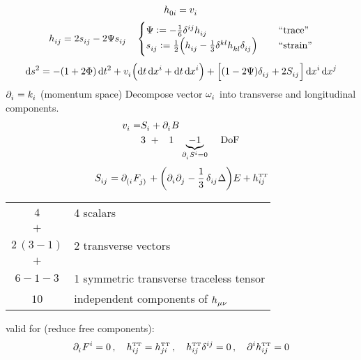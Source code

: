 \begin{equation}
    \tensor{h}{_{0i}} = \tensor{v}{_i}
\end{equation}
\begin{equation}
    \tensor{h}{_{ij}} = 2\tensor{s}{_{ij}} - 2\Psi\tensor{s}{_{ij}}\,\quad
    \begin{cases}
\Psi := -\frac{1}{6}\tensor{\delta}{^{ij}}\tensor{h}{_{ij}}\,\quad
&\text{``trace''} \\
\tensor{s}{_{ij}} := \frac{1}{2} \left(\tensor{h}{_{ij}} - \frac{1}{3}\tensor{\delta}{^{kl}}\tensor{h}{_{kl}}\tensor{\delta}{_{ij}}\right)\,\quad &\text{``strain''}
\end{cases}
\end{equation}
\begin{equation}
    \dif s^2 = -\left(1+2\Phi\right)\dif t^2 + \tensor{v}{_i} \left(\dif t \dif \tensor{x}{^i} + \dif t \dif \tensor{x}{^i}\right) + \left[\left(1-2\Psi\right)\tensor{\delta}{_{ij}} + 2 \tensor{S}{_{ij}} \right]\dif \tensor{x}{^i}\dif \tensor{x}{^j}
\end{equation}
$\tensor{\partial}{_i} = \tensor{k}{_i}$ (momentum space)
Decompose vector $\tensor{\omega}{_i}$ into transverse and longitudinal components.
\begin{align}
    \tensor{v}{_i} = &\tensor{S}{_i} + \tensor{\partial}{_i}B\\
    &3\,\,+\,\,\,\,\,1\,\,\,\,\underbrace{-1}_{\tensor{\partial}{_i}\tensor{S}{^i}=0}\,\quad \text{DoF}
\end{align}
\begin{equation}
    \tensor{S}{_{ij}} = \tensor{\partial}{_{(i}}\tensor{F}{_{j)}} + \left( \tensor{\partial}{_i}\tensor{\partial}{_j} - \frac{1}{3}\,\tensor{\delta}{_{ij}}\Delta\right) E + \tensor*{h}{_{ij}^{\text{\tiny TT}}}
\end{equation}
\begin{center}
    \begin{tabular}{c l}
        $4$ & 4 scalars \\
        $+$ & \\
        $2\,(3-1)$ & 2 transverse vectors \\
        $+$ & \\
        $6-1-3$ & 1 symmetric transverse traceless tensor \\
        \midrule
        $10$ & independent components of $\tensor{h}{_{\mu\nu}}$
    \end{tabular}
\end{center}
valid for (reduce free components):
\begin{equation}
    \tensor{\partial}{_i}\tensor{F}{^i}=0\,,\quad\tensor*{h}{_{ij}^{\text{\tiny TT}}}=\tensor*{h}{_{ji}^{\text{\tiny TT}}}\,,\quad\tensor*{h}{_{ij}^{\text{\tiny TT}}}\tensor{\delta}{^{ij}}=0\,,\quad\tensor{\partial}{^i}\tensor*{h}{_{ij}^{\text{\tiny TT}}}=0
\end{equation}

